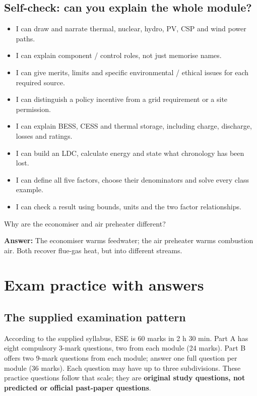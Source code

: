 \documentclass[11pt,a4paper]{article}
\newcommand{\chapterstart}[2]{\clearpage\section{#1}\label{#2}}
\newcommand{\checkq}[2]{\begin{tcolorbox}[breakable=false,colback=pale,colframe=teal,coltitle=white,title={Check your understanding}]#1\par\textbf{Answer:} #2\end{tcolorbox}}
\begin{document}
\subsection{Self-check: can you explain the whole module?}
\begin{itemize}
\item I can draw and narrate thermal, nuclear, hydro, PV, CSP and wind power paths.
\item I can explain component / control roles, not just memorise names.
\item I can give merits, limits and specific environmental / ethical issues for each required source.
\item I can distinguish a policy incentive from a grid requirement or a site permission.
\item I can explain BESS, CESS and thermal storage, including charge, discharge, losses and ratings.
\item I can build an LDC, calculate energy and state what chronology has been lost.
\item I can define all five factors, choose their denominators and solve every class example.
\item I can check a result using bounds, units and the two factor relationships.
\end{itemize}
\checkq{Why are the economiser and air preheater different?}{The economiser warms feedwater; the air preheater warms combustion air. Both recover flue-gas heat, but into different streams.}

\chapterstart{Exam practice with answers}{practice}
\subsection{The supplied examination pattern}
According to the supplied syllabus, ESE is 60 marks in 2 h 30 min. Part A has eight compulsory 3-mark questions, two from each module (24 marks). Part B offers two 9-mark questions from each module; answer one full question per module (36 marks). Each question may have up to three subdivisions. These practice questions follow that scale; they are \textbf{original study questions, not predicted or official past-paper questions}.
\end{document}
